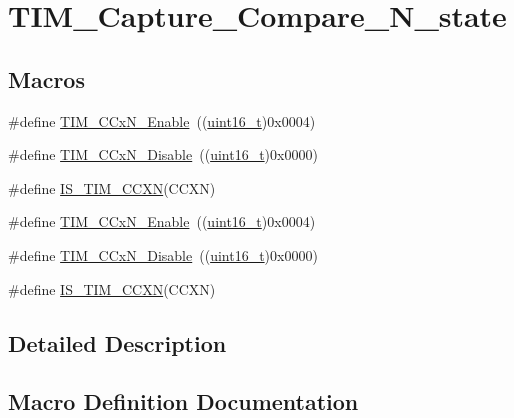 \hypertarget{group___t_i_m___capture___compare___n__state}{}\section{T\+I\+M\+\_\+\+Capture\+\_\+\+Compare\+\_\+\+N\+\_\+state}
\label{group___t_i_m___capture___compare___n__state}
\subsection*{Macros}
\begin{DoxyCompactItemize}
\item 
\#define \hyperlink{group___t_i_m___capture___compare___n__state_gab534ddf23d317eb912564292c1cede2d}{T\+I\+M\+\_\+\+C\+Cx\+N\+\_\+\+Enable}~((\hyperlink{_p_e___types_8h_a1f1825b69244eb3ad2c7165ddc99c956}{uint16\+\_\+t})0x0004)
\item 
\#define \hyperlink{group___t_i_m___capture___compare___n__state_ga0d7d46aeba33ed197aa39775bc527d7d}{T\+I\+M\+\_\+\+C\+Cx\+N\+\_\+\+Disable}~((\hyperlink{_p_e___types_8h_a1f1825b69244eb3ad2c7165ddc99c956}{uint16\+\_\+t})0x0000)
\item 
\#define \hyperlink{group___t_i_m___capture___compare___n__state_gad5a9f961e44c8d7c24066ac37ec79cbc}{I\+S\+\_\+\+T\+I\+M\+\_\+\+C\+C\+XN}(C\+C\+XN)
\item 
\#define \hyperlink{group___t_i_m___capture___compare___n__state_gab534ddf23d317eb912564292c1cede2d}{T\+I\+M\+\_\+\+C\+Cx\+N\+\_\+\+Enable}~((\hyperlink{_p_e___types_8h_a1f1825b69244eb3ad2c7165ddc99c956}{uint16\+\_\+t})0x0004)
\item 
\#define \hyperlink{group___t_i_m___capture___compare___n__state_ga0d7d46aeba33ed197aa39775bc527d7d}{T\+I\+M\+\_\+\+C\+Cx\+N\+\_\+\+Disable}~((\hyperlink{_p_e___types_8h_a1f1825b69244eb3ad2c7165ddc99c956}{uint16\+\_\+t})0x0000)
\item 
\#define \hyperlink{group___t_i_m___capture___compare___n__state_gad5a9f961e44c8d7c24066ac37ec79cbc}{I\+S\+\_\+\+T\+I\+M\+\_\+\+C\+C\+XN}(C\+C\+XN)
\end{DoxyCompactItemize}


\subsection{Detailed Description}


\subsection{Macro Definition Documentation}
